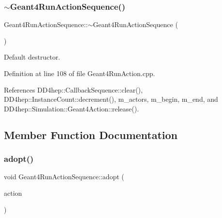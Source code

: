 \hypertarget{class_d_d4hep_1_1_simulation_1_1_geant4_run_action_sequence_a4489dd79f6a419c4788a73efd50f6024}{}\label{class_d_d4hep_1_1_simulation_1_1_geant4_run_action_sequence_a4489dd79f6a419c4788a73efd50f6024} 
\subsubsection{\texorpdfstring{$\sim$\+Geant4\+Run\+Action\+Sequence()}{~Geant4RunActionSequence()}}
{\footnotesize\ttfamily Geant4\+Run\+Action\+Sequence\+::$\sim$\+Geant4\+Run\+Action\+Sequence (\begin{DoxyParamCaption}{ }\end{DoxyParamCaption})\hspace{0.3cm}{\ttfamily [virtual]}}



Default destructor. 



Definition at line 108 of file Geant4\+Run\+Action.\+cpp.



References D\+D4hep\+::\+Callback\+Sequence\+::clear(), D\+D4hep\+::\+Instance\+Count\+::decrement(), m\+\_\+actors, m\+\_\+begin, m\+\_\+end, and D\+D4hep\+::\+Simulation\+::\+Geant4\+Action\+::release().



\subsection{Member Function Documentation}
\hypertarget{class_d_d4hep_1_1_simulation_1_1_geant4_run_action_sequence_a9daef9eac6020138426b08116710ceaf}{}\label{class_d_d4hep_1_1_simulation_1_1_geant4_run_action_sequence_a9daef9eac6020138426b08116710ceaf} 
\subsubsection{\texorpdfstring{adopt()}{adopt()}}
{\footnotesize\ttfamily void Geant4\+Run\+Action\+Sequence\+::adopt (\begin{DoxyParamCaption}\item[{\hyperlink{class_d_d4hep_1_1_simulation_1_1_geant4_run_action}{Geant4\+Run\+Action} $\ast$}]{action }\end{DoxyParamCaption})}



